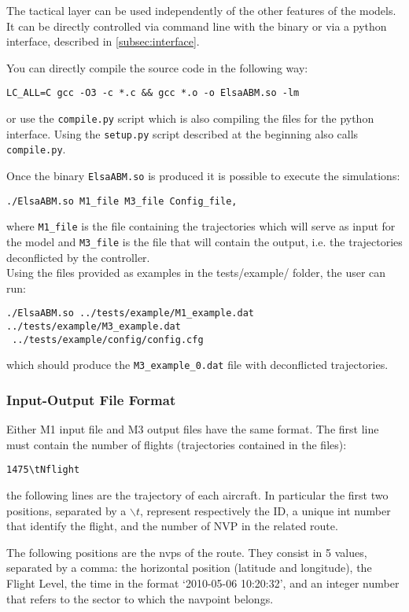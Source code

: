 \documentclass[12pt]{article}
\begin{document}
The tactical layer can be used independently of the other features of the models. It can be directly controlled via command line with the binary or via a python interface, described in \ref{subsec:interface}.

You can directly compile the source code in the following way:

\begin{verbatim}
LC_ALL=C gcc -O3 -c *.c && gcc *.o -o ElsaABM.so -lm
\end{verbatim}
or use the \verb|compile.py| script which is also compiling the files for the python interface. Using the \verb|setup.py| script described at the beginning also calls \verb|compile.py|.

Once the binary \verb|ElsaABM.so| is produced it is possible to execute the simulations:

\begin{verbatim}
./ElsaABM.so M1_file M3_file Config_file,
\end{verbatim}
where \verb|M1_file| is the file containing the trajectories which will serve as input for the model and \verb|M3_file| is the file that will contain the output, i.e. the trajectories deconflicted by the controller.
\\

Using the files provided as examples in the tests/example/ folder, the user can run:
\begin{verbatim}
./ElsaABM.so ../tests/example/M1_example.dat ../tests/example/M3_example.dat
 ../tests/example/config/config.cfg
\end{verbatim}
which should produce the \verb|M3_example_0.dat| file with deconflicted trajectories. 

\subsubsection{Input-Output File Format}

Either M1 input file and M3 output files have the same format. The first line must contain the number of flights (trajectories contained in the files):
\begin{verbatim}
1475\tNflight
\end{verbatim}
the following lines are the trajectory of each aircraft. In particular the first two positions, separated by a $\backslash t$,  represent respectively the ID, a unique int number that identify the flight, and the number of NVP in the related route. 

The following positions are the nvps of the route. They consist in 5 values, separated by a comma: the horizontal position (latitude and longitude), the Flight Level, the time in the format `2010-05-06 10:20:32', and an integer number that refers to the sector to which the navpoint belongs. 
\end{document}
